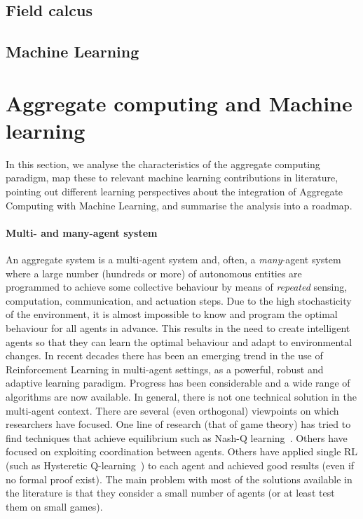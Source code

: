 \documentclass[
  twocolumn,
]{ceurart}
\begin{document}
\subsection{Field calcus}
\subsection{Machine Learning}

\section{Aggregate computing and Machine learning}

In this section,
 we analyse the characteristics of the aggregate computing paradigm,
 map these to relevant machine learning contributions in literature,
 pointing out different learning perspectives about the integration of Aggregate Computing with Machine Learning,
 and summarise the analysis into a roadmap.

\paragraph{Multi- and many-agent system}
%
An aggregate system is a multi-agent system
 and, often, a \emph{many}-agent system
 where a large number (hundreds or more)
 of autonomous entities are programmed to achieve 
 some collective behaviour by means of \emph{repeated} 
 sensing, computation, communication, and actuation steps.
%
Due to the high stochasticity of the environment,
 it is almost impossible to know and
 program the optimal behaviour for all agents in advance.
 This results in the need to create intelligent agents
 so that they can learn the optimal behaviour and adapt to environmental changes.
%
In recent decades there has been an emerging trend in the use of Reinforcement Learning
 in multi-agent settings, as a powerful, robust and adaptive learning paradigm.
 Progress has been considerable and a wide range of algorithms are now available.
In general, there is not one technical solution in the multi-agent context.
 There are several (even orthogonal) viewpoints on which researchers have focused.
 One line of research (that of game theory) has tried to find techniques that achieve equilibrium such as Nash-Q learning~\cite{nash-q}.
 Others have focused on exploiting coordination between agents. 
 Others have applied single RL (such as Hysteretic Q-learning~\cite{hysteretic-q}) to each agent and achieved good results (even if no formal proof exist).
%
 The main problem with most of the solutions available in the literature is that they consider a small number of agents (or at least test them on small games).
\end{document}
